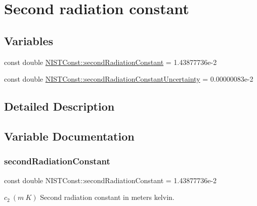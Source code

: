 \hypertarget{group___n_i_s_t_const-_second_radiation_constant}{}\section{Second radiation constant}
\label{group___n_i_s_t_const-_second_radiation_constant}
\subsection*{Variables}
\begin{DoxyCompactItemize}
\item 
const double \hyperlink{group___n_i_s_t_const-_second_radiation_constant_ga40dfad662ee17ea208d271fa0977e69c}{N\+I\+S\+T\+Const\+::second\+Radiation\+Constant} = 1.\+43877736e-\/2
\item 
const double \hyperlink{group___n_i_s_t_const-_second_radiation_constant_gac28d837ca8654ec72930d67641724af4}{N\+I\+S\+T\+Const\+::second\+Radiation\+Constant\+Uncertainty} = 0.\+00000083e-\/2
\end{DoxyCompactItemize}


\subsection{Detailed Description}


\subsection{Variable Documentation}
\mbox{\label{group___n_i_s_t_const-_second_radiation_constant_ga40dfad662ee17ea208d271fa0977e69c}} 
\subsubsection{\texorpdfstring{second\+Radiation\+Constant}{secondRadiationConstant}}
{\footnotesize\ttfamily const double N\+I\+S\+T\+Const\+::second\+Radiation\+Constant = 1.\+43877736e-\/2}

$c_2 \ (m\ K)$ Second radiation constant in meters kelvin. \mbox{\label{group___n_i_s_t_const-_second_radiation_constant_gac28d837ca8654ec72930d67641724af4}} 
